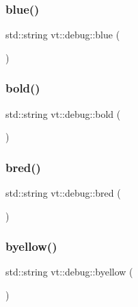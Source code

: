 \mbox{\label{namespacevt_1_1debug_a26b73aa7586b78f4c148b26e5414ebe1}} 
\subsubsection{\texorpdfstring{blue()}{blue()}}
{\footnotesize\ttfamily std\+::string vt\+::debug\+::blue (\begin{DoxyParamCaption}{ }\end{DoxyParamCaption})\hspace{0.3cm}{\ttfamily [inline]}}

\mbox{\label{namespacevt_1_1debug_a7a1e7bc4a250917d20840a4d48e27388}} 
\subsubsection{\texorpdfstring{bold()}{bold()}}
{\footnotesize\ttfamily std\+::string vt\+::debug\+::bold (\begin{DoxyParamCaption}{ }\end{DoxyParamCaption})\hspace{0.3cm}{\ttfamily [inline]}}

\mbox{\label{namespacevt_1_1debug_ae03a761958b929eaa82f356059f71a46}} 
\subsubsection{\texorpdfstring{bred()}{bred()}}
{\footnotesize\ttfamily std\+::string vt\+::debug\+::bred (\begin{DoxyParamCaption}{ }\end{DoxyParamCaption})\hspace{0.3cm}{\ttfamily [inline]}}

\mbox{\label{namespacevt_1_1debug_afb3aac4faf63d7f2aac0d6d142d0b599}} 
\subsubsection{\texorpdfstring{byellow()}{byellow()}}
{\footnotesize\ttfamily std\+::string vt\+::debug\+::byellow (\begin{DoxyParamCaption}{ }\end{DoxyParamCaption})\hspace{0.3cm}{\ttfamily [inline]}}

